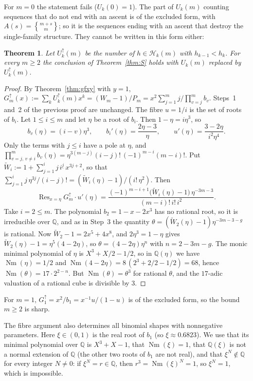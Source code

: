 \documentclass[11pt]{amsart}
\newtheorem{theorem}{Theorem}[section]
\theoremstyle{definition}
\newcommand{\stirling}[2]{\genfrac{\{}{\}}{0pt}{}{#1}{#2}}
\newcommand{\Q}{\mathbb{Q}}
\DeclareMathOperator{\Res}{Res}
\DeclareMathOperator{\Nm}{Nm}
\begin{document}
For $m=0$ the statement fails ($U_k(0)=1$). The part of $U_k(m)$ counting sequences that do not end with an ascent is of the excluded form, with $A(s)=\stirling{m+s}{m}$; so it is the sequences ending with an ascent that destroy the single-family structure. They cannot be written in this form either:

\begin{theorem}\label{thm:Spart}
Let $U^{\uparrow}_k(m)$ be the number of $h\in \mathcal H_k(m)$ with $h_{k-1}<h_k$. For every $m\ge2$ the conclusion of Theorem~\ref{thm:S} holds with $U_k(m)$ replaced by $U^{\uparrow}_k(m)$.
\end{theorem}

\begin{proof}
By Theorem~\ref{thm:gfxy} with $y=1$, $G^{\uparrow}_m(x):=\sum_kU^{\uparrow}_k(m)x^k=(W_m-1)/P_m=x^2\sum_{j=1}^{m}j/\prod_{v=j}^{m}b_v$. Steps~1 and~2 of the previous proof are unchanged. The fibre $u=1/i$ is the set of roots of $b_i$. Let $1\le i\le m$ and let $\eta$ be a root of $b_i$. Then $1-\eta=i\eta^3$, so
\[
  b_v(\eta)=(i-v)\eta^3,\qquad b_i'(\eta)=\frac{2\eta-3}{\eta},\qquad u'(\eta)=\frac{3-2\eta}{i^2\eta^4}.
\]
Only the terms with $j\le i$ have a pole at $\eta$, and $\prod_{v=j,\,v\ne i}^{m}b_v(\eta)=\eta^{3(m-j)}(i-j)!\,(-1)^{m-i}(m-i)!$. Put $\tilde W_i:=1+\sum_{j=1}^{i}j\,i^{\underline j}\,x^{3j+2}$, so that $\sum_{j=1}^{i}j\,\eta^{3j}/(i-j)!=(\tilde W_i(\eta)-1)/(i!\,\eta^2)$. Then
\[
  \Res_{x=\eta}G^{\uparrow}_m\cdot u'(\eta)=\frac{(-1)^{m-i+1}\bigl(\tilde W_i(\eta)-1\bigr)\,\eta^{-3m-3}}{(m-i)!\,i!\,i^2}.
\]
Take $i=2\le m$. The polynomial $b_2=1-x-2x^3$ has no rational root, so it is irreducible over $\Q$, and as in Step~3 the quantity $\theta=(\tilde W_2(\eta)-1)\eta^{-3m-3-g}$ is rational. Now $\tilde W_2-1=2x^5+4x^8$, and $2\eta^3=1-\eta$ gives $\tilde W_2(\eta)-1=\eta^5(4-2\eta)$, so $\theta=(4-2\eta)\eta^n$ with $n=2-3m-g$. The monic minimal polynomial of $\eta$ is $X^3+X/2-1/2$, so in $\Q(\eta)$ we have $\Nm(\eta)=1/2$ and $\Nm(4-2\eta)=8\,(2^3+2/2-1/2)=68$, hence $\Nm(\theta)=17\cdot2^{2-n}$. But $\Nm(\theta)=\theta^3$ for rational $\theta$, and the $17$-adic valuation of a rational cube is divisible by $3$.
\end{proof}

For $m=1$, $G^{\uparrow}_1=x^2/b_1=x^{-1}u/(1-u)$ is of the excluded form, so the bound $m\ge2$ is sharp.

The fibre argument also determines all binomial shapes with nonnegative parameters. Here $\xi\in(0,1)$ is the real root of $b_1$ (so $\xi\approx0.6823$). We use that its minimal polynomial over $\Q$ is $X^3+X-1$, that $\Nm(\xi)=1$, that $\Q(\xi)$ is not a normal extension of $\Q$ (the other two roots of $b_1$ are not real), and that $\xi^N\notin\Q$ for every integer $N\ne0$: if $\xi^N=r\in\Q$, then $r^3=\Nm(\xi)^N=1$, so $\xi^N=1$, which is impossible.
\end{document}
